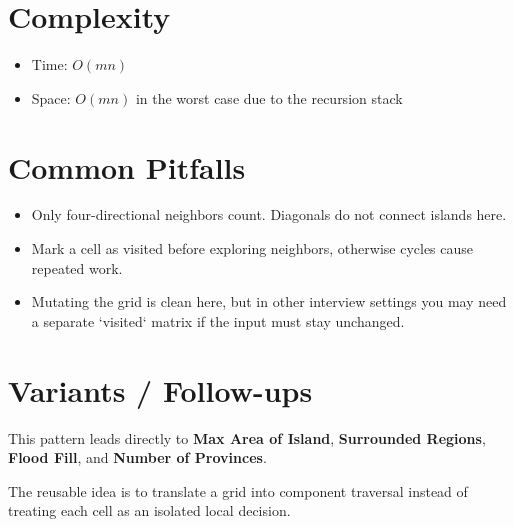 \section{Complexity}
\begin{itemize}
\item Time: \(O(mn)\)
\item Space: \(O(mn)\) in the worst case due to the recursion stack
\end{itemize}

\section{Common Pitfalls}
\begin{itemize}
\item Only four-directional neighbors count. Diagonals do not connect islands here.
\item Mark a cell as visited before exploring neighbors, otherwise cycles cause repeated work.
\item Mutating the grid is clean here, but in other interview settings you may need a separate `visited` matrix if the input must stay unchanged.
\end{itemize}

\section{Variants / Follow-ups}
This pattern leads directly to \textbf{Max Area of Island}, \textbf{Surrounded Regions}, \textbf{Flood Fill}, and \textbf{Number of Provinces}.

The reusable idea is to translate a grid into component traversal instead of treating each cell as an isolated local decision.
